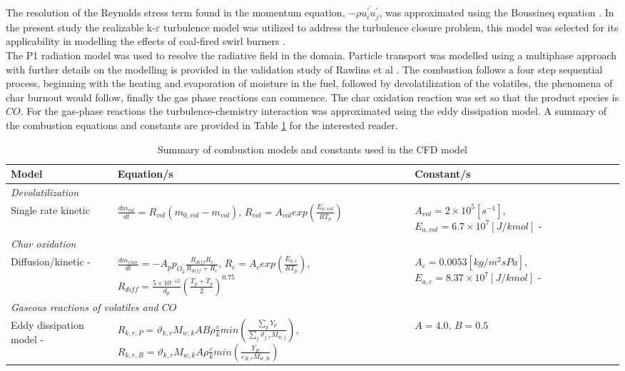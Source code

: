\documentclass[a4paper,fleqn]{cas-sc}
\begin{document}
The resolution of the Reynolds stress term found in the momentum equation, $-\rho\overline{u_{i}^{'}u_{j}^{'}}$, was approximated using the Boussineq equation \citep{Versteeg2007}. In the present study the realizable k-$\varepsilon$ turbulence model was utilized to address the turbulence closure problem, this model was selected for its applicability in modelling the effects of coal-fired swirl burners \citep{Modlinski2010}.\\

The P1 radiation model was used to resolve the radiative field in the domain. Particle transport was modelled using a multiphase approach with further details on the modelling is provided in the validation study of Rawlins et al \citep{Rawlins2021}. The combustion follows a four step sequential process, beginning with the heating and evaporation of moisture in the fuel, followed by devolatilization of the volatiles, the phenomena of char burnout would follow, finally the gas phase reactions can commence. The char oxidation reaction was set so that the product species is $CO$. For the gas-phase reactions the turbulence-chemistry interaction was approximated using the eddy dissipation model. A summary of the combustion equations and constants are provided in Table \ref{tbl_combust} for the interested reader.\\

\begin{table}[h!]
\caption{Summary of combustion models and constants used in the CFD model}\label{tbl_combust}
\begin{tabular*}{\tblwidth}{p{}p{}p{}}
\toprule
Model & Equation/s & Constant/s\\
\midrule
\multicolumn{3}{l}{\textit{Devolatilization}} \\ %
Single rate kinetic &$\frac{dm_{vol}}{dt} = R_{vol}(m_{0,vol}-m_{vol})$, $R_{vol} = A_{vol}exp\left(\frac{E_{a,vol}}{RT_p}\right)$  & $A_{vol} = 2\times10^5 [s^{-1}]$, $ E_{a,vol} = 6.7\times10^7 [J/kmol]$ - \cite{Sheng2004} \\
\multicolumn{3}{l}{\textit{Char oxidation}} \\
Diffusion/kinetic - \citep{Baum1971} & $\frac{dm_{char}}{dt} = -A_p p_{O_{2}} \frac{R_{diff}R_c}{R_{diff} + R_c}$, $R_{c} = A_{c}exp\left(\frac{E_{a,c}}{RT_p}\right)$, $R_{diff} = \frac{5\times10^{-12}}{d_p} \left(\frac{T_g+T_p}{2}\right)^{0.75}$ & $A_{c} = 0.0053 [kg/m^2sPa]$, $E_{a,c} = 8.37\times10^7 [J/kmol]$ - \cite{Sheng2004}\\
\multicolumn{3}{l}{\textit{Gaseous reactions of volatiles and $CO$}} \\
Eddy dissipation model - \cite{Ansys} & $R_{k,r,P} =\vartheta_{k,r}M_{w,k}AB\rho\frac{\varepsilon}{k}min\left(\frac{\sum_{p} Y_p}{\sum_{j}\vartheta_{j,r}M_{w,j}}\right)$, $R_{k,r,R} =\vartheta_{k,r}M_{w,k}A\rho\frac{\varepsilon}{k}min\left(\frac{Y_R}{\varepsilon_{R,r}M_{w,R}}\right)$ & $A=4.0$, $B=0.5$\\
\bottomrule
\end{tabular*}
\end{table}
\end{document}
